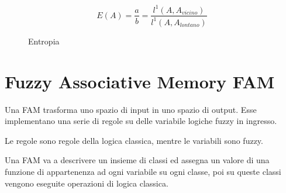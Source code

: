 \documentclass[\main/main.tex]{subfiles}
\begin{document}
\begin{figure}[H]
	\[
	E(A) = \dfrac{a}{b} = \dfrac{l^1(A, A_{vicino})}{l^1(A, A_{lontano})}
	\]
	\caption{Entropia}
\end{figure}

\section{Fuzzy Associative Memory FAM}
Una FAM trasforma uno spazio di input in uno spazio di output. Esse implementano una serie di regole su delle variabile logiche fuzzy in ingresso.

Le regole sono regole della logica classica, mentre le variabili sono fuzzy.

Una FAM va a descrivere un insieme di classi ed assegna un valore di una funzione di appartenenza ad ogni variabile su ogni classe, poi su queste classi vengono eseguite operazioni di logica classica.
\end{document}
